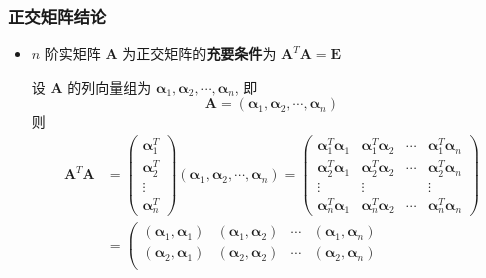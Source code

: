 \documentclass{article}
\begin{document}
				\subsubsection*{正交矩阵结论}
				\begin{itemize}
					\item $n$ 阶实矩阵 $\boldsymbol{A}$ 为正交矩阵的\textbf{充要条件}为 $\boldsymbol{A}^{T} \boldsymbol{A}=\boldsymbol{E}$

					设 $\boldsymbol{A}$ 的列向量组为 $\boldsymbol{\alpha}_{1}, \boldsymbol{\alpha}_{2}, \cdots, \boldsymbol{\alpha}_{n}$, 即
					$$
					\boldsymbol{A}=\left(\boldsymbol{\alpha}_{1}, \boldsymbol{\alpha}_{2}, \cdots, \boldsymbol{\alpha}_{n}\right)
					$$
					则
					$$
					\begin{aligned}
						\boldsymbol{A}^{T} \boldsymbol{A} &=\left(\begin{array}{c}
							\boldsymbol{\alpha}_{1}^{T} \\
							\boldsymbol{\alpha}_{2}^{T} \\
							\vdots \\
							\boldsymbol{\alpha}_{n}^{T}
						\end{array}\right)\left(\boldsymbol{\alpha}_{1}, \boldsymbol{\alpha}_{2}, \cdots, 	\boldsymbol{\alpha}_{n}\right)=\left(\begin{array}{cccc}
							\boldsymbol{\alpha}_{1}^{T} \boldsymbol{\alpha}_{1} & 	\boldsymbol{\alpha}_{1}^{T} \boldsymbol{\alpha}_{2} & \cdots & \boldsymbol{\alpha}_{1}^{T} \boldsymbol{\alpha}_{n} \\
							\boldsymbol{\alpha}_{2}^{T} \boldsymbol{\alpha}_{1} & 	\boldsymbol{\alpha}_{2}^{T} \boldsymbol{\alpha}_{2} & \cdots & \boldsymbol{\alpha}_{2}^{T} \boldsymbol{\alpha}_{n} \\
							\vdots & \vdots & & \vdots \\
							\boldsymbol{\alpha}_{n}^{T} \boldsymbol{\alpha}_{1} & 	\boldsymbol{\alpha}_{n}^{T} \boldsymbol{\alpha}_{2} & \cdots & \boldsymbol{\alpha}_{n}^{T} \boldsymbol{\alpha}_{n}
						\end{array}\right) \\
						&=\left(\begin{array}{cccc}
							\left(\boldsymbol{\alpha}_{1}, \boldsymbol{\alpha}_{1}\right) & \left(\boldsymbol{\alpha}_{1}, 	\boldsymbol{\alpha}_{2}\right) & \cdots & \left(\boldsymbol{\alpha}_{1}, \boldsymbol{\alpha}_{n}\right) \\
							\left(\boldsymbol{\alpha}_{2}, \boldsymbol{\alpha}_{1}\right) & \left(\boldsymbol{\alpha}_{2}, 	\boldsymbol{\alpha}_{2}\right) & \cdots & \left(\boldsymbol{\alpha}_{2}, \boldsymbol{\alpha}_{n}\right) \\

\end{array}
\end{aligned}$$
\end{itemize}
\end{document}
